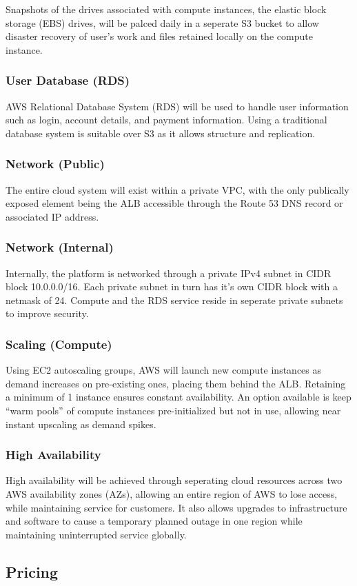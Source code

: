 Snapshots of the drives associated with compute instances, the elastic block storage (EBS) drives, will be palced daily in a seperate S3 bucket to allow disaster recovery of user's work and files retained locally on the compute instance.

\subsubsection*{User Database (RDS)}

AWS Relational Database System (RDS) will be used to handle user information such as login, account details, and payment information. Using a traditional database system is suitable over S3 as it allows structure and replication.

\subsubsection*{Network (Public)}

The entire cloud system will exist within a private VPC, with the only publically exposed element being the ALB accessible through the Route 53 DNS record or associated IP address.

\subsubsection*{Network (Internal)}

Internally, the platform is networked through a private IPv4 subnet in CIDR block 10.0.0.0/16. Each private subnet in turn has it's own CIDR block with a netmask of 24. Compute and the RDS service reside in seperate private subnets to improve security.

\subsubsection*{Scaling (Compute)}

Using EC2 autoscaling groups, AWS will launch new compute instances as demand increases on pre-existing ones, placing them behind the ALB. Retaining a minimum of 1 instance ensures constant availability. An option available is keep ``warm pools'' of compute instances pre-initialized but not in use, allowing near instant upscaling as demand spikes.

\subsubsection*{High Availability}

High availability will be achieved through seperating cloud resources across two AWS availability zones (AZs), allowing an entire region of AWS to lose access, while maintaining service for customers. It also allows upgrades to infrastructure and software to cause a temporary planned outage in one region while maintaining uninterrupted service globally.

\subsection{Pricing}

